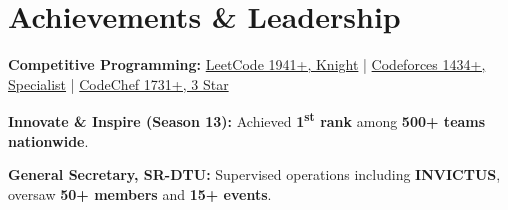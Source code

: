 \section{Achievements \& Leadership}
\begin{itemize}[leftmargin=0.15in, label={}, itemsep=1pt, parsep=0pt]
\small{
  \item \textbf{Competitive Programming:} 
  \href{https://leetcode.com/u/anujjoshi3105}{LeetCode 1941+, Knight} \;|\;
  \href{https://codeforces.com/profile/anujjoshi3105}{Codeforces 1434+, Specialist} \;|\;
  \href{https://www.codechef.com/users/anujjoshi3105}{CodeChef 1731+, 3 Star}

  \item \textbf{Innovate \& Inspire (Season 13):} Achieved \textbf{1\textsuperscript{st} rank} among \textbf{500+ teams nationwide}.

\item \textbf{General Secretary, SR-DTU:}
Supervised operations including \textbf{INVICTUS}, oversaw \textbf{50+ members} and \textbf{15+ events}.
}
\end{itemize}